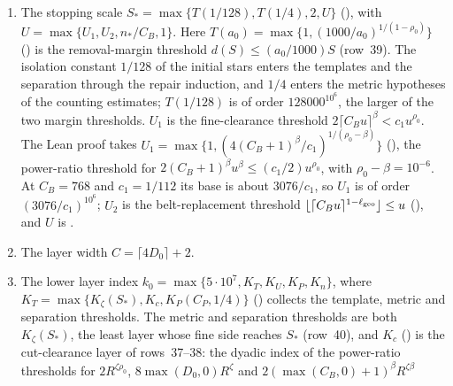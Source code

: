 \documentclass[11pt]{article}
\begin{document}
\begin{enumerate}
          stand-alone 
          still takes $c_1$ from the existential
          .
    \item The stopping scale $S_*=\max\{T(1/128),T(1/4),2,U\}$
          (), with
          $U=\max\{U_1,U_2,n_*/C_B,1\}$. Here
          $T(a_0)=\max\{1,(1000/a_0)^{1/(1-\rho_0)}\}$
          () is the
          removal-margin threshold $d(S)\le(a_0/1000)S$ (row~39). The isolation
          constant $1/128$ of the initial stars enters the templates and the
          separation through the repair induction, and $1/4$ enters the metric
          hypotheses of the counting estimates; $T(1/128)$ is of order
          $128000^{10^6}$, the larger of the two margin thresholds. $U_1$ is the fine-clearance threshold
          $2\lceil C_Bu\rceil^\beta<c_1u^{\rho_0}$. The Lean proof takes
          $U_1=\max\{1,(4(C_B+1)^\beta/c_1)^{1/(\rho_0-\beta)}\}$
          (), the
          power-ratio threshold for
          $2(C_B+1)^\beta u^\beta\le(c_1/2)u^{\rho_0}$, with
          $\rho_0-\beta=10^{-6}$. At $C_B=768$ and $c_1=1/112$ its base is
          about $3076/c_1$, so $U_1$ is of order $(3076/c_1)^{10^6}$; $U_2$
          is the belt-replacement threshold
          $\lfloor\lceil C_Bu\rceil^{1-\ell_{\rm geo}}\rfloor\le u$
          (),
          and $U$ is .
    \item The layer width $C=\lceil4D_0\rceil+2$.
    \item The lower layer index
          $k_0=\max\{5\cdot10^7,K_T,K_U,K_P,K_n\}$, where
          $K_T=\max\{K_\zeta(S_*),K_c,K_P(C_P,1/4)\}$
          ()
          collects the template, metric and separation thresholds. The metric
          and separation thresholds are both $K_\zeta(S_*)$, the least layer
          whose fine side reaches $S_*$ (row~40), and $K_c$
          ()
          is the cut-clearance layer of rows~37--38: the dyadic index of the
          power-ratio thresholds for $2R^{\zeta\rho_0}$,
          $8\max(D_0,0)R^\zeta$ and $2(\max(C_B,0)+1)^\beta R^{\zeta\beta}$

\end{enumerate}
\end{document}
